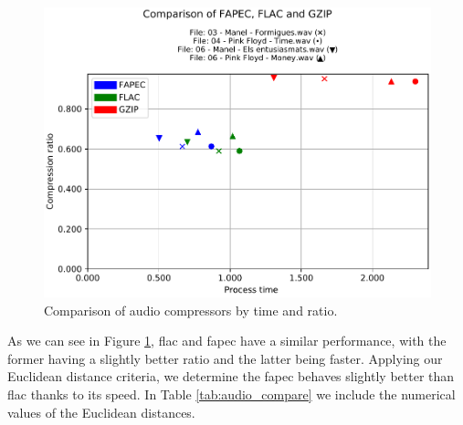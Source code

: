 \begin{figure}[h!]
	\begin{center}
		\includegraphics[scale=0.69]{images/2021-05-30T22:30:32.186296-results_wave.csv_comparison.pdf}
	\end{center}
	\caption{Comparison of audio compressors by time and ratio.}
	\label{fig:audio_compare}
\end{figure}

As we can see in Figure \ref{fig:audio_compare}, \acrshort{flac} and \acrshort{fapec} have a similar performance, with the former having a slightly better ratio and the latter being faster. Applying our Euclidean distance criteria, we determine the \acrshort{fapec} behaves slightly better than \acrshort{flac} thanks to its speed. In Table \ref{tab:audio_compare} we include the numerical values of the Euclidean distances.

